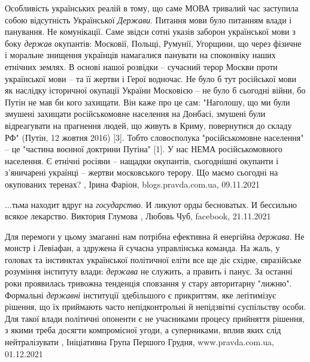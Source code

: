 Особливість українських реалій в тому, що саме МОВА тривалий час заступила
собою відсутність Української \emph{Держави}. Питання мови було питанням влади і
панування. Не комунікації. Саме звідси сотні указів заборон української мови з
боку \emph{держав} окупантів: Московії, Польщі, Румунії, Угорщини, що через фізичне і
моральне знищення українців намагалися панувати на споконвіку наших етнічних
землях.  В основі нашої розвідки – сучасний терор Москви проти української мови
– та її жертви і Герої водночас. Не було б тут російської мови як наслідку
історичної окупації України Московією – не було б сьогодні війни, бо Путін не
мав би кого захищати. Він каже про це сам: "Наголошу, що ми були змушені
захищати російськомовне населення на Донбасі, змушені були відреагувати на
прагнення людей, що живуть в Криму, повернутися до складу РФ" (Путін, 12 жовтня
2016) [3].  Тобто словосполука "російськомовне населення" – це "частина воєнної
доктрини Путіна" [1]. У нас НЕМА російськомовного населення. Є етнічні росіяни
– нащадки окупантів, сьогоднішні окупанти і з'яничарені українці – жертви
московського терору.  Що маємо сьогодні на окупованих теренах?
, 
Ірина Фаріон, blogs.pravda.com.ua, 09.11.2021

...тьма находит вдруг на \emph{государство}.
И ликуют орды бесноватых.
И бессильно всякое лекарство.
Виктория Глумова
, 
Любовь Чуб, facebook, 21.11.2021

Для перемоги у цьому змаганні нам потрібна ефективна й енергійна \emph{держава}. Не
монстр і Левіафан, а здружена й сучасна управлінська команда. На жаль, у
головах та інстинктах української політичної еліти все ще діє східне,
євразійське розуміння інституту влади: \emph{держава} не служить, а править і панує.
За останні роки проявилась тривожна тенденція сповзання у стару авторитарну
"лижню". Формальні \emph{державні} інституції здебільшого є прикриттям, яке
леґітимізує рішення, що їх приймають часто непідконтрольні й непідзвітні
суспільству особи. Для такої влади політичні опоненти є не учасниками процесу
прийняття рішення, з якими треба досягти компромісної угоди, а суперниками,
вплив яких слід нейтралізувати
, 
Ініціативна Група Першого Грудня, www.pravda.com.ua, 01.12.2021
